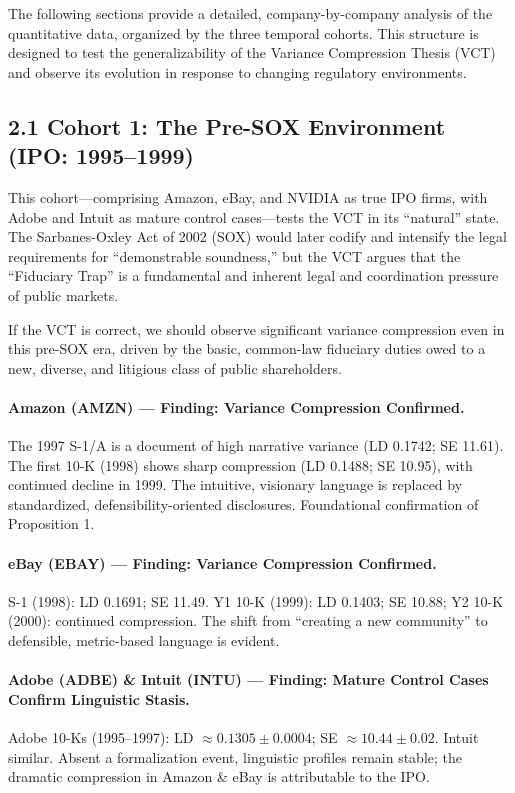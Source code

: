 \documentclass[12pt]{article}
\begin{document}
The following sections provide a detailed, company-by-company analysis of the quantitative data, organized by the three temporal cohorts. This structure is designed to test the generalizability of the Variance Compression Thesis (VCT) and observe its evolution in response to changing regulatory environments.

\subsection*{2.1 Cohort 1: The Pre-SOX Environment (IPO: 1995--1999)}

This cohort---comprising Amazon, eBay, and NVIDIA as true IPO firms, with Adobe and Intuit as mature control cases---tests the VCT in its ``natural'' state. The Sarbanes-Oxley Act of 2002 (SOX) would later codify and intensify the legal requirements for ``demonstrable soundness,'' but the VCT argues that the ``Fiduciary Trap'' is a fundamental and inherent legal and coordination pressure of public markets.

If the VCT is correct, we should observe significant variance compression even in this pre-SOX era, driven by the basic, common-law fiduciary duties owed to a new, diverse, and litigious class of public shareholders.

\paragraph{Amazon (AMZN) --- Finding: Variance Compression Confirmed.}
The 1997 S-1/A is a document of high narrative variance (LD 0.1742; SE 11.61). The first 10-K (1998) shows sharp compression (LD 0.1488; SE 10.95), with continued decline in 1999. The intuitive, visionary language is replaced by standardized, defensibility-oriented disclosures. Foundational confirmation of Proposition 1.

\paragraph{eBay (EBAY) --- Finding: Variance Compression Confirmed.}
S-1 (1998): LD 0.1691; SE 11.49. Y1 10-K (1999): LD 0.1403; SE 10.88; Y2 10-K (2000): continued compression. The shift from ``creating a new community'' to defensible, metric-based language is evident.

\paragraph{Adobe (ADBE) \& Intuit (INTU) --- Finding: Mature Control Cases Confirm Linguistic Stasis.}
Adobe 10-Ks (1995--1997): LD $\approx 0.1305 \pm 0.0004$; SE $\approx 10.44 \pm 0.02$. Intuit similar. Absent a formalization event, linguistic profiles remain stable; the dramatic compression in Amazon \& eBay is attributable to the IPO.
\end{document}
